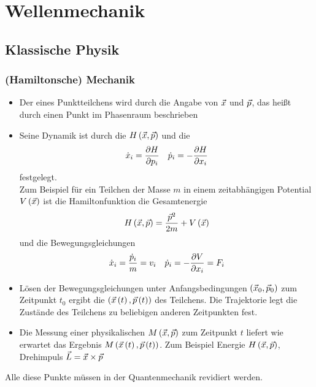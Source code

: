 \section{Wellenmechanik}
\subsection{Klassische Physik}

\subsubsection{(Hamiltonsche) Mechanik}
\begin{itemize}
  \item Der  eines Punktteilchens wird durch die Angabe von  $\vec{x}$ und  $\vec{p}$, das heißt durch einen Punkt im Phasenraum beschrieben
  \item Seine Dynamik ist durch die  $H\left(\vec{x},\vec{p}\right)$ und die 
  \begin{equation}
    \dot{x}_i = \frac{\partial H}{\partial p_i} \quad \dot{p}_i = - \frac{\partial H}{\partial x_i}
  \end{equation}
  festgelegt.\\
  Zum Beispiel für ein Teilchen der Masse $m$ in einem zeitabhängigen Potential $V\left(\vec{x}\right)$ ist die Hamiltonfunktion die Gesamtenergie
  \begin{equation}
    H\left(\vec{x},\vec{p}\right) = \frac{\vec{p}^2}{2m} + V\left(\vec{x}\right)
  \end{equation}
  und die Bewegungsgleichungen
  \begin{equation}
    \dot{x}_i = \frac{\dot{p}_i}{m} = v_i \quad \dot{p}_i = - \frac{\partial V}{\partial x_i} = F_i
  \end{equation}
  \item Lösen der Bewegungsgleichungen unter Anfangsbedingungen $\left( \vec{x}_0,\vec{p}_0 \right)$ zum Zeitpunkt $t_0$ ergibt die  $\left( \vec{x}\left(t\right),\vec{p}\left(t\right) \right)$ des Teilchens. Die Trajektorie legt die Zustände des Teilchens zu beliebigen anderen Zeitpunkten fest.
  \item Die Messung einer physikalischen  $M\left(\vec{x},\vec{p}\right)$ zum Zeitpunkt $t$ liefert wie erwartet das Ergebnis $M\left(\vec{x}\left(t\right),\vec{p}\left(t\right)\right)$. Zum Beispiel Energie $H\left(\vec{x},\vec{p}\right)$, Drehimpuls $\vec{L} = \vec{x}\times\vec{p}$
\end{itemize}
Alle diese Punkte müssen in der Quantenmechanik revidiert werden.

